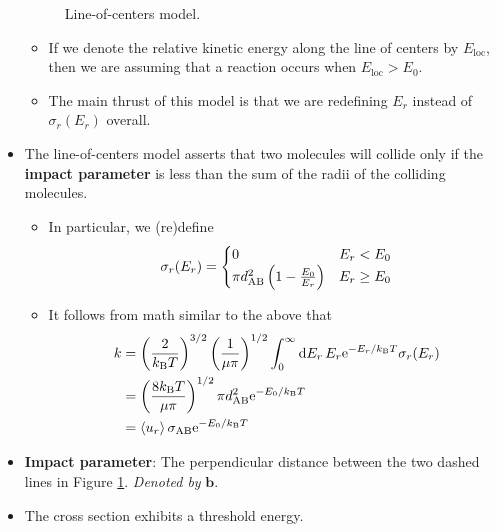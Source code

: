 \documentclass[../notes.tex]{subfiles}
\begin{document}
\begin{itemize}
\begin{figure}[h!]
        \caption{Line-of-centers model.}
        \label{fig:lineOfCenters}
    \end{figure}
    \begin{itemize}
        \item If we denote the relative kinetic energy along the line of centers by $E_\text{loc}$, then we are assuming that a reaction occurs when $E_\text{loc}>E_0$.
        \item The main thrust of this model is that we are redefining $E_r$ instead of $\sigma_r(E_r)$ overall.
    \end{itemize}
    \item The line-of-centers model asserts that two molecules will collide only if the \textbf{impact parameter} is less than the sum of the radii of the colliding molecules.
    \begin{itemize}
        \item In particular, we (re)define
        \begin{equation*}
            \sigma_r(E_r) =
            \begin{cases}
                0 & E_r<E_0\\
                \pi d_{\ce{A}\ce{B}}^2\left( 1-\frac{E_0}{E_r} \right) & E_r\geq E_0
            \end{cases}
        \end{equation*}
        \item It follows from math similar to the above that
        \begin{align*}
            k &= \left( \frac{2}{\kB T} \right)^{3/2}\left( \frac{1}{\mu\pi} \right)^{1/2}\int_0^\infty\dd{E_r}E_r\e[-E_r/\kB T]\sigma_r(E_r)\\
            &= \left( \frac{8\kB T}{\mu\pi} \right)^{1/2}\pi d_{\ce{A}\ce{B}}^2\e[-E_0/\kB T]\\
            &= \prb{u_r}\sigma_{\ce{A}\ce{B}}\e[-E_0/\kB T]
        \end{align*}
    \end{itemize}
    \item \textbf{Impact parameter}: The perpendicular distance between the two dashed lines in Figure \ref{fig:lineOfCenters}. \emph{Denoted by} $\bm{b}$.
    \item The cross section exhibits a threshold energy.

\end{itemize}
\end{document}
